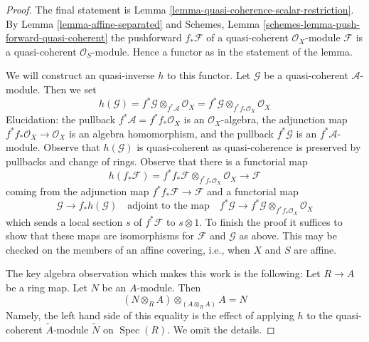 \documentclass[10pt,a4paper]{amsart}
\theoremstyle{plain}
\theoremstyle{definition}
\theoremstyle{remark}
\numberwithin{equation}{subsection}
\def\Spec{\mathop{\mathrm{Spec}}}
\begin{document}
\begin{proof}
The final statement is Lemma \ref{lemma-quasi-coherence-scalar-restriction}.
By Lemma \ref{lemma-affine-separated} and
Schemes, Lemma \ref{schemes-lemma-push-forward-quasi-coherent}
the pushforward $f_*\mathcal{F}$ of a quasi-coherent $\mathcal{O}_X$-module
$\mathcal{F}$
is a quasi-coherent $\mathcal{O}_S$-module. Hence a functor as in
the statement of the lemma.

\medskip\noindent
We will construct an quasi-inverse $h$ to this functor. Let $\mathcal{G}$
be a quasi-coherent $\mathcal{A}$-module. Then we set
$$
h(\mathcal{G}) = f^*\mathcal{G} \otimes_{f^*\mathcal{A}} \mathcal{O}_X =
f^*\mathcal{G} \otimes_{f^*f_*\mathcal{O}_X} \mathcal{O}_X
$$
Elucidation: the pullback $f^*\mathcal{A} = f^*f_*\mathcal{O}_X$
is an $\mathcal{O}_X$-algebra, the adjunction map
$f^*f_*\mathcal{O}_X \to \mathcal{O}_X$ is an algebra homomorphism, and
the pullback $f^*\mathcal{G}$ is an $f^*\mathcal{A}$-module. Observe that
$h(\mathcal{G})$ is quasi-coherent as quasi-coherence is preserved by
pullbacks and change of rings. Observe that there is a functorial map
$$
h(f_*\mathcal{F}) =
f^*f_*\mathcal{F} \otimes_{f^*f_*\mathcal{O}_X} \mathcal{O}_X \to \mathcal{F}
$$
coming from the adjunction map $f^*f_*\mathcal{F} \to \mathcal{F}$ and
a functorial map
$$
\mathcal{G} \to f_*h(\mathcal{G}) \quad\text{adjoint to the map}\quad
f^*\mathcal{G} \to f^*\mathcal{G} \otimes_{f^*f_*\mathcal{O}_X} \mathcal{O}_X
$$
which sends a local section $s$ of $f^*\mathcal{F}$ to $s \otimes 1$.
To finish the proof it suffices to show that these maps are isomorphisms
for $\mathcal{F}$ and $\mathcal{G}$ as above. This may be checked on the
members of an affine covering, i.e., when $X$ and $S$ are affine.

\medskip\noindent
The key algebra observation which makes this work is the
following: Let $R \to A$ be a ring map. Let $N$ be an $A$-module. Then
$$
(N \otimes_R A) \otimes_{(A \otimes_R A)} A = N
$$
Namely, the left hand side of this equality is the effect of applying
$h$ to the quasi-coherent $\widetilde{A}$-module $\widetilde{N}$ on $\Spec(R)$.
We omit the details.
\end{proof}
\end{document}
